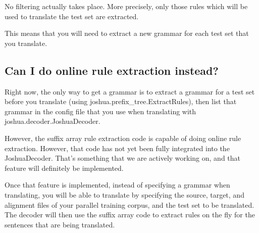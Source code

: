 No filtering actually takes place. More precisely, only those rules which will be used to translate the test set are extracted.

This means that you will need to extract a new grammar for each test set that you translate.


\subsection{Can I do online rule extraction instead?}

Right now, the only way to get a grammar is to extract a grammar for a test set before you translate (using joshua.prefix_tree.ExtractRules), then list that grammar in the config file that you use when translating with joshua.decoder.JoshuaDecoder.

However, the suffix array rule extraction code is capable of doing online rule extraction. However, that code has not yet been fully integrated into the JoshuaDecoder. That's something that we are actively working on, and that feature will definitely be implemented.

Once that feature is implemented, instead of specifying a grammar when translating, you will be able to translate by specifying the source, target, and alignment files of your parallel training corpus, and the test set to be translated. The decoder will then use the suffix array code to extract rules on the fly for the sentences that are being translated.


